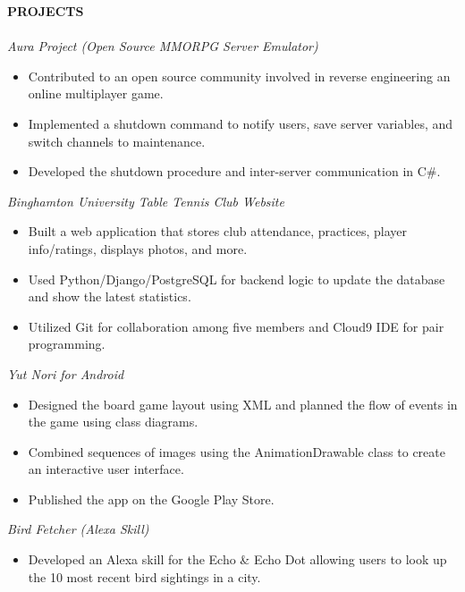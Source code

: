\documentclass[10.5pt]{res}
\newcommand{\itemSpace}{\vspace{-8pt}}
\begin{document}
\begin{resume}
\textbf{PROJECTS} \\ [-10.5pt]
\noindent\makebox[\linewidth]{\rule{\textwidth}{0.4pt}}\\
{\it Aura Project (Open Source MMORPG Server Emulator)}\\ [-11pt]  
	\begin{itemize} \itemsep -1pt %
	\item Contributed to an open source community involved in reverse engineering an online multiplayer game.
 	\item Implemented a shutdown command to notify users, save server variables, and switch channels to maintenance.
	\item Developed the shutdown procedure and inter-server communication in C\#.
	\end{itemize}
	\itemSpace
{\it Binghamton University Table Tennis Club Website} \\ [-11pt]  
	\begin{itemize} \itemsep -1pt %
	\item Built a web application that stores club attendance, practices, player info/ratings, displays photos, and more.
 	\item Used Python/Django/PostgreSQL for backend logic to update the database and show the latest statistics.
	\item Utilized Git for collaboration among five members and Cloud9 IDE for pair programming.
	\end{itemize}
	\itemSpace
{\it Yut Nori for Android} \\ [-11pt]  
	\begin{itemize} \itemsep -1pt %
	\item Designed the board game layout using XML and planned the flow of events in the game using class diagrams.
 	\item Combined sequences of images using the AnimationDrawable class to create an interactive user interface.
	\item Published the app on the Google Play Store.
	\end{itemize}
	\itemSpace
{\it Bird Fetcher (Alexa Skill)}\\ [-11pt]  
	\begin{itemize} \itemsep -1pt %
	\item Developed an Alexa skill for the Echo \& Echo Dot allowing users to look up the 10 most recent bird sightings in a city.

\end{itemize}
\end{resume}
\end{document}
